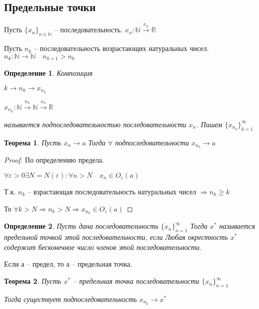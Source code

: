\documentclass{book}
\newtheorem{Def}{Определение}[chapter]
\newtheorem{Th}{Теорема}[chapter]
\begin{document}
\subsection{Предельные точки}

Пусть $\{x_n\}_{n \in \mathds{N}}$ -- последовательность. $x_n: \mathds{N} \overset{x_n}{\rightarrow} \mathds{R}$

Пусть $n_k$ -- последовательность возрастающих натуральных чисел. $n_k: \mathds{N}\rightarrow \mathds{N}\quad n_{k+1} > n_k$

\begin{Def}
	Композиция
	
	$k \rightarrow n_k \rightarrow x_{n_k}$
	
	$x_{n_k}: \mathds{N} \overset{n_k}{\rightarrow} \mathds{N} \overset{x_n}{\rightarrow} \mathds{R} $
	
	называется подпоследовательностью последовательности $x_n$. Пишем $\{x_{n_k}\}^{\infty}_{k=1}$
\end{Def}

\begin{Th}
	Пусть $x_n \rightarrow a$ Тогда $\forall$ подпоследовательности $x_{n_k} \rightarrow a$
\end{Th}
\begin{proof}
	По определению предела.
	
	$\forall \varepsilon>0 \exists N = N(\varepsilon): \forall n > N \quad x_n \in O_{\varepsilon}(a)$
	
	Т.к. $n_k$ -- взрастающая последовательность натуральных чисел $\Rightarrow n_k \geqslant k$
	
	То $\forall k > N \Rightarrow n_k > N \Rightarrow x_{n_k} \in O_{\varepsilon}(a)$
\end{proof}

\begin{Def}
	Пусть дана последовательность $\{x_n\}^{\infty}_{n=1}$
	Тогда $x^*$ называется предельной точкой этой последовательности, если Любая окрестность $x^*$ содержит бесконечное число членов этой последовательности.  
\end{Def}

Если а -- предел, то а -- предельная точка.

\begin{Th}
	Пусть $x^*$ -- предельная точка последовательности $\{x_n\}^{\infty}_{n=1}$
	
	Тогда существует подпоследовательность $x_{n_k}\rightarrow x^*$
\end{Th}
\end{document}
